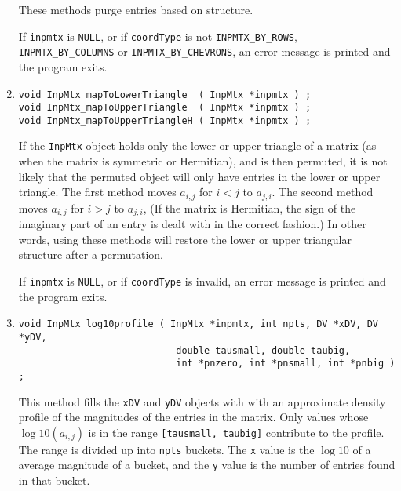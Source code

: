 \begin{enumerate}
These methods purge entries based on structure.
\par {}
If {\tt inpmtx} is {\tt NULL},
or if {\tt coordType} is not {\tt INPMTX\_BY\_ROWS},
{\tt INPMTX\_BY\_COLUMNS} or {\tt INPMTX\_BY\_CHEVRONS},
an error message is printed and the program exits.
\item
\begin{verbatim}
void InpMtx_mapToLowerTriangle  ( InpMtx *inpmtx ) ;
void InpMtx_mapToUpperTriangle  ( InpMtx *inpmtx ) ;
void InpMtx_mapToUpperTriangleH ( InpMtx *inpmtx ) ;
\end{verbatim}
If the {\tt InpMtx} object holds only the lower or upper triangle
of a matrix (as when the matrix is symmetric or Hermitian), 
and is then permuted, 
it is not likely that the permuted object will only have entries in
the lower or upper triangle.
The first method moves $a_{i,j}$ for $i < j$ to $a_{j,i}$.
The second method moves $a_{i,j}$ for $i > j$ to $a_{j,i}$,
(If the matrix is Hermitian, the sign of the imaginary part of an
entry is dealt with in the correct fashion.)
In other words, using these methods will restore the lower or upper
triangular structure after a permutation.
\par {}
If {\tt inpmtx} is {\tt NULL},
or if {\tt coordType} is invalid,
an error message is printed and the program exits.
\item
\begin{verbatim}
void InpMtx_log10profile ( InpMtx *inpmtx, int npts, DV *xDV, DV *yDV,
                            double tausmall, double taubig, 
                            int *pnzero, int *pnsmall, int *pnbig ) ;
\end{verbatim}
This method fills the {\tt xDV} and {\tt yDV} objects with with an
approximate density profile of the magnitudes of the entries in the
matrix.
Only values whose $\log10(a_{i,j})$ is in the range 
{\tt [tausmall, taubig]} contribute to the profile.
The range is divided up into {\tt npts} buckets.
The {\tt x} value is the $\log10$ of a average magnitude 
of a bucket, and the {\tt y}
value is the number of entries found in that bucket.

\end{enumerate}

